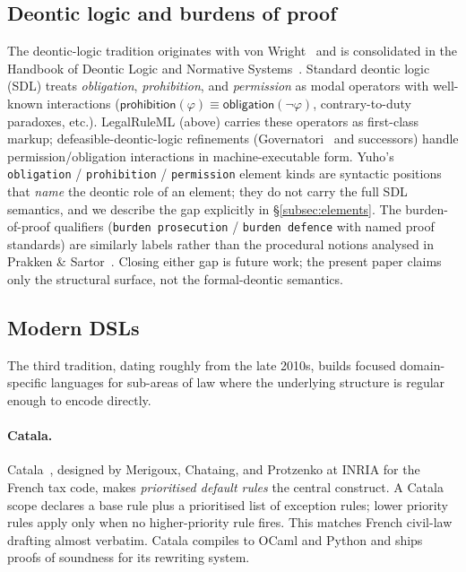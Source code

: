 \subsection{Deontic logic and burdens of proof}
\label{subsec:deontic-bg}
The deontic-logic tradition originates with von
Wright~\cite{vonwright1951deontic} and is consolidated in the
Handbook of Deontic Logic and Normative
Systems~\cite{deonticlogic2013handbook}. Standard deontic logic (SDL)
treats \emph{obligation}, \emph{prohibition}, and \emph{permission} as
modal operators with well-known interactions
(\(\textsf{prohibition}(\varphi) \equiv \textsf{obligation}(\neg\varphi)\),
contrary-to-duty paradoxes, etc.). LegalRuleML (above) carries these
operators as first-class markup; defeasible-deontic-logic refinements
(Governatori~\cite{governatori2005ruleml} and successors) handle
permission/obligation interactions in machine-executable form. Yuho's
\texttt{obligation} / \texttt{prohibition} / \texttt{permission} element
kinds are syntactic positions that \emph{name} the deontic role of an
element; they do not carry the full SDL semantics, and we describe the
gap explicitly in \S\ref{subsec:elements}. The burden-of-proof
qualifiers (\texttt{burden prosecution} / \texttt{burden defence} with
named proof standards) are similarly labels rather than the procedural
notions analysed in Prakken \&
Sartor~\cite{prakken2009burdens}. Closing either gap is future work;
the present paper claims only the structural surface, not the
formal-deontic semantics.

\subsection{Modern DSLs}
The third tradition, dating roughly from the late 2010s, builds focused
domain-specific languages for sub-areas of law where the underlying
structure is regular enough to encode directly.

\paragraph{Catala.} Catala~\cite{catala2021}, designed by Merigoux,
Chataing, and Protzenko at INRIA for the French tax code, makes
\emph{prioritised default rules} the central construct. A Catala scope
declares a base rule plus a prioritised list of exception rules; lower
priority rules apply only when no higher-priority rule fires. This
matches French civil-law drafting almost verbatim. Catala compiles to
OCaml and Python and ships proofs of soundness for its rewriting system.

